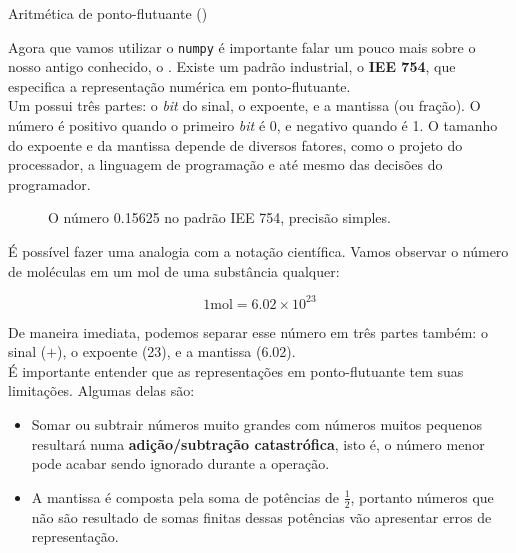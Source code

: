 \documentclass[12pt]{article}
\begin{document}
	\begin{interlude}{Aritmética de ponto-flutuante ()}
	
	Agora que vamos utilizar o \texttt{numpy} é importante falar um pouco mais sobre o nosso antigo conhecido, o . Existe um padrão industrial, o \textbf{IEE 754}, que especifica a representação numérica em ponto-flutuante.\\
	
	Um  possui três partes:	o \textit{bit} do sinal, o expoente, e a mantissa (ou fração). O número é positivo quando o primeiro \textit{bit} é 0, e negativo quando é 1. O tamanho do expoente e da mantissa depende de diversos fatores, como o projeto do processador, a linguagem de programação e até mesmo das decisões do programador.
	
	\begin{figure}[H]
	\centering
	\small
	  
	\caption{O número 0.15625 no padrão IEE 754, precisão simples.}
	\end{figure}
	
	É possível fazer uma analogia com a notação científica. Vamos observar o número de moléculas em um mol de uma substância qualquer:
	
		$$1 \text{mol} = 6.02 \times 10^{23}$$

	De maneira imediata, podemos separar esse número em três partes também: o sinal ($+$), o expoente (23), e a mantissa (6.02).\\
	
	É importante entender que as representações em ponto-flutuante tem suas limitações. Algumas delas são:
	
	\begin{itemize}
	\item Somar ou subtrair números muito grandes com números muitos pequenos resultará numa \textbf{adição/subtração catastrófica}, isto é, o número menor pode acabar sendo ignorado durante a operação.
	
	\item A mantissa é composta pela soma de potências de $\frac{1}{2}$, portanto números que não são resultado de somas finitas dessas potências vão apresentar erros de representação.
	\end{itemize}
	
	\end{interlude}
	
	
\end{document}
